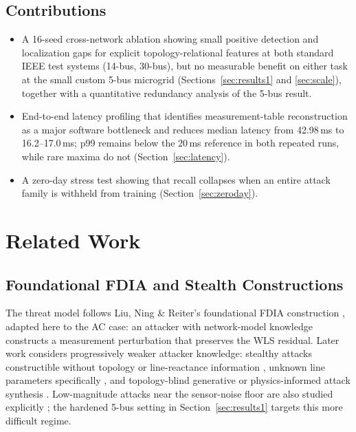 \documentclass[conference]{IEEEtran}
\begin{document}
\subsection{Contributions}
\begin{itemize}
\item A 16-seed cross-network ablation showing small positive detection and localization gaps for explicit topology-relational features at both standard IEEE test systems (14-bus, 30-bus), but no measurable benefit on either task at the small custom 5-bus microgrid (Sections~\ref{sec:results1} and \ref{sec:scale}), together with a quantitative redundancy analysis of the 5-bus result.
\item End-to-end latency profiling that identifies measurement-table reconstruction as a major software bottleneck and reduces median latency from 42.98\,ms to 16.2--17.0\,ms; p99 remains below the 20\,ms reference in both repeated runs, while rare maxima do not (Section~\ref{sec:latency}).
\item A zero-day stress test showing that recall collapses when an entire attack family is withheld from training (Section~\ref{sec:zeroday}).
\end{itemize}

\section{Related Work}
\label{sec:related}

\subsection{Foundational FDIA and Stealth Constructions}
The threat model follows Liu, Ning \& Reiter's foundational FDIA construction \cite{liu2011false}, adapted here to the AC case: an attacker with network-model knowledge constructs a measurement perturbation that preserves the WLS residual. Later work considers progressively weaker attacker knowledge: stealthy attacks constructible without topology or line-reactance information \cite{anwar2016modeling}, unknown line parameters specifically \cite{du2021targeted}, and topology-blind generative or physics-informed attack synthesis \cite{zhao2025blind}. Low-magnitude attacks near the sensor-noise floor are also studied explicitly \cite{li2026physically}; the hardened 5-bus setting in Section~\ref{sec:results1} targets this more difficult regime.
\end{document}
